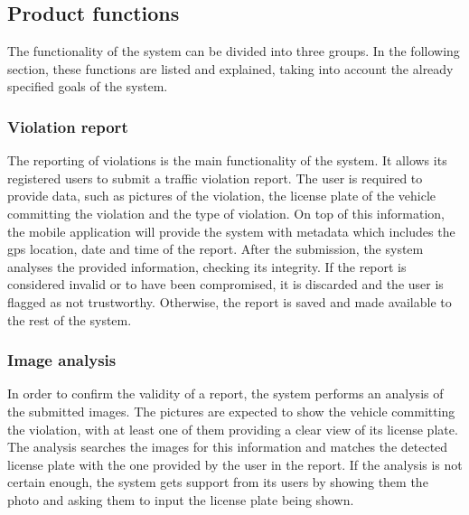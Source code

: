 \subsection{Product functions}
The functionality of the system can be divided into three groups. In the following section, these functions are listed and explained, taking into account the already specified goals of the system.

\subsubsection{Violation report}
The reporting of violations is the main functionality of the system. It allows its registered users to submit a traffic violation report. The user is required to provide data, such as pictures of the violation, the license plate of the vehicle committing the violation and the type of violation. On top of this information, the mobile application will provide the system with metadata which includes the gps location, date and time of the report.
After the submission, the system analyses the provided information, checking its integrity. If the report is considered invalid or to have been compromised, it is discarded and the user is flagged as not trustworthy. Otherwise, the report is saved and made available to the rest of the system.

\subsubsection{Image analysis}
In order to confirm the validity of a report, the system performs an analysis of the submitted images. The pictures are expected to show the vehicle committing the violation, with at least one of them providing a clear view of its license plate. The analysis searches the images for this information and matches the detected license plate with the one provided by the user in the report. If the analysis is not certain enough, the system gets support from its users by showing them the photo and asking them to input the license plate being shown.

